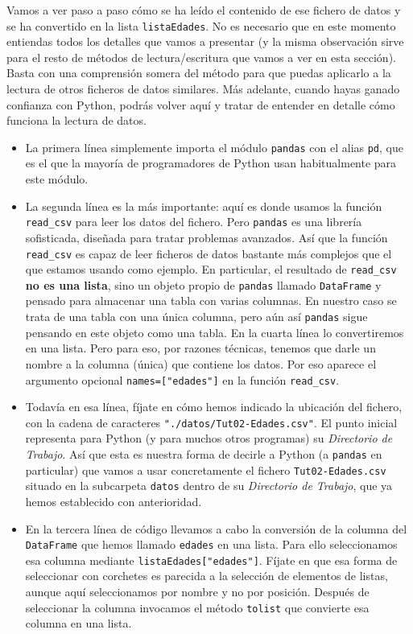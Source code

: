 \documentclass[10pt,a4paper]{article}\usepackage[]{graphicx}\usepackage[]{color}
\newcounter {cont01}
\begin{document}
Vamos a ver paso a paso cómo se  ha leído el contenido de ese fichero de datos y se ha convertido en la lista {\tt listaEdades}. No es necesario que en este momento entiendas todos los detalles que vamos a presentar (y la misma observación sirve para el resto de métodos de lectura/escritura que vamos a ver en esta sección). Basta con una comprensión somera del método para que puedas aplicarlo a la lectura de otros ficheros de datos similares. Más adelante, cuando hayas ganado confianza con Python, podrás volver aquí y tratar de entender en detalle cómo funciona la lectura de datos.
\begin{itemize}

\item La primera línea simplemente importa el módulo {\tt pandas} con el alias {\tt pd}, que es el que la mayoría de programadores de Python usan habitualmente para este módulo.

\item La segunda línea es la más importante: aquí es donde usamos la función \verb&read_csv& para leer los datos del fichero. Pero {\tt pandas} es una librería sofisticada, diseñada para tratar problemas avanzados. Así que la función \verb&read_csv& es capaz de leer ficheros de datos bastante más complejos que el que estamos usando como ejemplo. En particular, el resultado de \verb&read_csv& {\bf no es una lista}, sino un objeto propio de {\tt pandas} llamado {\tt DataFrame} y pensado para almacenar una tabla con varias columnas. En nuestro caso se trata de una tabla con una única columna, pero aún así {\tt pandas} sigue pensando en este objeto como una tabla. En la cuarta línea lo convertiremos en una lista. Pero para eso, por razones técnicas, tenemos que darle un nombre a la  columna (única) que contiene los datos. Por eso aparece el argumento opcional \verb&names=["edades"]& en la función \verb&read_csv&.\\

\item Todavía en esa línea, fíjate en cómo hemos indicado la ubicación del fichero, con la cadena de caracteres \verb&"./datos/Tut02-Edades.csv"&. El punto inicial representa para Python (y para muchos otros programas) su {\em Directorio de  Trabajo}. Así que esta es nuestra forma de decirle a Python (a {\tt pandas} en particular) que vamos a usar concretamente el fichero {\tt Tut02-Edades.csv} situado en la subcarpeta {\tt datos} dentro de su {\em Directorio de  Trabajo}, que ya hemos establecido con anterioridad.

\item En la tercera línea de código llevamos a cabo la conversión de la columna del {\tt DataFrame} que hemos llamado {\tt edades} en una lista. Para ello seleccionamos esa columna mediante \verb#listaEdades["edades"]#. Fíjate en que esa forma de seleccionar con corchetes es parecida a la selección de elementos de listas, aunque aquí seleccionamos por nombre y no por posición. Después de seleccionar la columna invocamos el método {\tt tolist} que convierte esa columna en una lista.
\end{itemize}
\end{document}
